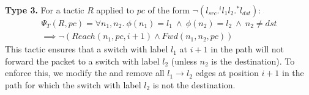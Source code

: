 \noindent\textbf{Type 3.} For a tactic $R$ applied to $pc$ 
of the form $\neg (l_{src}  .^i l_1 l_2 .^* l_{dst})$: 
\begin{multline} \label{eq:t3}
\Psi_T(R,pc) = \forall n_1, n_2.~\phi(n_1) = l_1~\wedge~ \phi(n_2) = l_2 ~\wedge~ n_2 \not=dst \\  \implies 
\neg (Reach(n_1, pc, i + 1) \wedge Fwd(n_1, n_2, pc))
\end{multline}
This tactic ensures that a switch with label $l_1$ at $i+1$ in the path
will not forward the packet to a switch with label $l_2$ (unless $n_2$ is the destination). 
To enforce this, we modify the  and remove all $l_1\rightarrow l_2$
edges at position $i+1$ in the path for which the switch with label $l_2$  is not the destination.  


